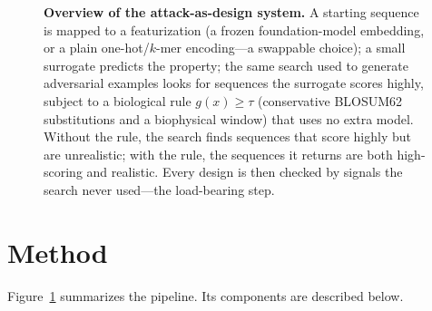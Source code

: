 \documentclass{article}
\begin{document}
\begin{figure}[t]
\caption{\textbf{Overview of the attack-as-design system.} A starting sequence is mapped to a
featurization (a frozen foundation-model embedding, or a plain one-hot/$k$-mer encoding---a
swappable choice); a small surrogate predicts the property; the same search used to generate
adversarial examples looks for sequences the surrogate scores highly, subject to a biological
rule $g(x)\ge\tau$ (conservative BLOSUM62 substitutions and a biophysical window) that uses no
extra model. Without the rule, the search finds sequences that score highly but are
unrealistic; with the rule, the sequences it returns are both high-scoring and realistic.
Every design is then checked by signals the search never used---the load-bearing step.}
\label{fig:overview}
\end{figure}

\section{Method}

Figure~\ref{fig:overview} summarizes the pipeline. Its components are described below.
\end{document}
